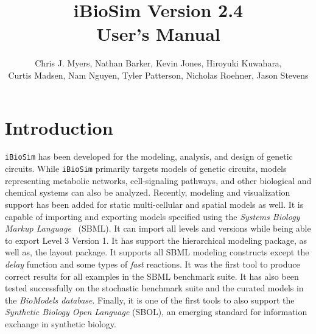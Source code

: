 \documentclass[titlepage,11pt]{article}
\title{iBioSim Version 2.4 \\ User's Manual}
\author{Chris J. Myers, Nathan Barker, Kevin Jones, Hiroyuki Kuwahara,\\ Curtis
  Madsen, Nam Nguyen, Tyler Patterson, Nicholas Roehner, Jason Stevens}
\begin{document}
\maketitle

  
\tableofcontents

\clearpage

\section{Introduction}

\noindent
{\tt iBioSim} has been developed for the modeling, analysis, and design of genetic circuits.  While {\tt iBioSim} primarily targets models of genetic circuits, models representing metabolic networks, cell-signaling pathways, and other biological and chemical systems can also be analyzed.  Recently, modeling and visualization support has been added for static multi-cellular and spatial models as well.
It is capable of importing and exporting models specified using the %
\emph{Systems Biology Markup Language}
~(SBML).  It can import all levels and versions while being able to export Level 3 Version 1.  It has support the hierarchical modeling package, as well as, the layout package.  It supports all SBML modeling constructs except the \emph{delay} function and some types of \emph{fast} reactions.  It was the first tool to produce correct results for all examples in the SBML benchmark suite.  It has also been tested successfully on the stochastic benchmark suite and the curated models in the 
\emph{BioModels database}.
Finally, it is one of the first tools to also support the 
\emph{Synthetic Biology Open Language}
(SBOL), an emerging standard for information exchange in synthetic biology.
\end{document}
